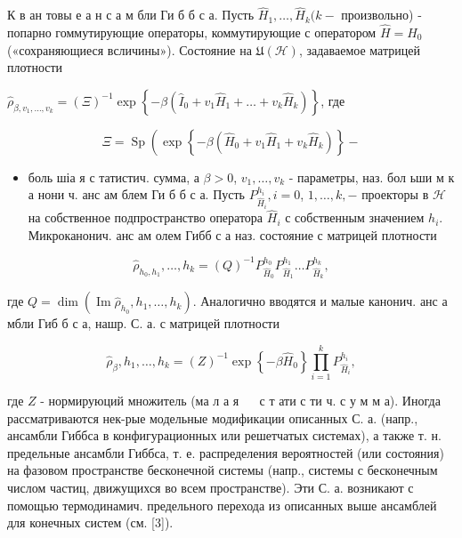 \documentclass[10pt]{article}
\begin{document}
К в ан товы е а н с а м бли Ги б б с а. Пусть $\hat{H}_{1}, \ldots, \hat{H}_{k}(k-$ произвольно) - попарно гоммутирующие операторы, коммутирующие с оператором $\hat{H}=\widehat{H}_{0} \quad$ («сохраняющиеся всличины»). Состояние на $\mathfrak{U}(\mathscr{H})$, задаваемое матрицей плотности



$\hat{\rho}_{\beta, v_{1}, \ldots, v_{k}}=(\Xi)^{-1} \exp \left\{-\beta\left(\hat{I}_{0}+v_{1} \hat{H}_{1}+\ldots+v_{k} \hat{H}_{k}\right)\right\}$, где



\[

\Xi=\operatorname{Sp}\left(\exp \left\{-\beta\left(\hat{H}_{0}+v_{1} \hat{H}_{1}+v_{k} \hat{H}_{k}\right)\right\}-\right.

\]



\begin{itemize}

  \item боль шіа я с татистич. сумма, а $\beta>0$, $v_{1}, \ldots, v_{k}$ - параметры, наз. бол ьши м к а нони ч. анс ам блем Ги б б с а. Пусть $P_{\hat{H}_{i}}^{h_{i}}, i=0$, $1, \ldots, k,-$ проекторы в $\mathscr{H}$ на собственное подпространство оператора $\hat{H}_{i}$ с собственным значением $h_{i}$. Микроканонич. анс ам олем Гибб с а наз. состояние с матрицей плотности

\end{itemize}



\[

\hat{\rho}_{h_{0}, h_{1}}, \ldots, h_{k}=(Q)^{-1} P_{\hat{H}_{0}}^{h_{0}} P_{\hat{H}_{1}}^{h_{1}} \ldots P_{\hat{H}_{k}}^{h_{k}},

\]



где $Q=\operatorname{dim}\left(\operatorname{Im} \hat{\rho}_{h_{0}}, h_{1}, \ldots, h_{k}\right)$. Аналогично вводятся и малые канонич. анс а мбли Гиб б с а, нашр. С. а. с матрицей плотности



\[

\hat{\rho}_{\beta}, h_{1}, \ldots, h_{k}=(Z)^{-1} \exp \left\{-\beta \hat{H}_{0}\right\} \prod_{i=1}^{k} P_{\hat{H}_{i}}^{h_{i}},

\]



где $Z$ - нормируюций множитель (ма л а я $\quad$ с т ати с ти ч. с у м м а). Иногда рассматриваются нек-рые модельные модификации описанных С. а. (напр., ансамбли Гиббса в конфигурационных или решетчатых системах), а также т. н. предельные ансамбли Гиббса, т. е. распределения вероятностей (или состояния) на фазовом пространстве бесконечной системы (напр., системы с бесконечным числом частиц, движущихся во всем пространстве). Эти С. а. возникают с помощью термодинамич. предельного перехода из описанных выше ансамблей для конечных систем (см. [3]).
\end{document}
